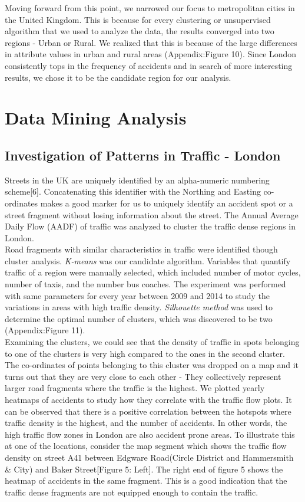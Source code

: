 \documentclass{neu_handout}
\begin{document}
Moving forward from this point, we narrowed our focus to metropolitan cities in the United Kingdom. This is because for every clustering or unsupervised algorithm that we used to analyze the data, the results converged into two regions - Urban or Rural. We realized that this is because of the large differences in attribute values in urban and rural areas (Appendix:Figure 10). Since London consistently  tops in the frequency of accidents and in search of more interesting results, we chose it to be the candidate region for our analysis.

\section{Data Mining Analysis}

\subsection{Investigation of Patterns in Traffic - London}
Streets in the UK are uniquely identified by an alpha-numeric numbering scheme[6]. Concatenating this identifier with the Northing and Easting co-ordinates makes a good marker for us to uniquely identify an accident spot or a street fragment without losing information about the street. The Annual Average Daily Flow (AADF) of traffic was analyzed to cluster the traffic dense regions in London. \\

Road fragments with similar characteristics in traffic were identified though cluster analysis. \textit{K-means} was our candidate algorithm. Variables that quantify traffic of a region were manually selected, which included number of motor cycles, number of taxis, and the number bus coaches. The  experiment was performed with same parameters for every year between 2009 and 2014 to study the variations in areas with high traffic density. \textit{Silhouette method} was used to determine the optimal number of clusters, which was discovered to be two (Appendix:Figure 11).\\

Examining the clusters, we could see that the density of traffic in spots belonging to one of the clusters is very high compared to the ones in the second cluster. The co-ordinates of points belonging to this cluster was dropped on a map and it turns out that they are very close to each other - They collectively represent larger road fragments where the traffic is the highest. We plotted yearly heatmaps of accidents to study how they correlate with the traffic flow plots. It can be observed that there is a positive correlation between the hotspots where traffic density is the highest, and the number of accidents. In other words, the high traffic flow zones in London are also accident prone areas. To illustrate this at one of the locations, consider the map segment which shows the traffic flow density on street A41 between Edgware Road(Circle District and Hammersmith \& City) and Baker Street[Figure 5: Left]. The right end of figure 5 shows the heatmap of accidents in the same fragment. This is a good indication that the traffic dense fragments are not equipped enough to contain the traffic. \\
\end{document}
